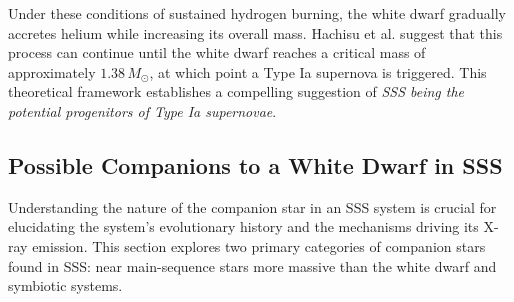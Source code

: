 			Under these conditions of sustained hydrogen burning, the white dwarf gradually accretes helium while increasing its overall mass. Hachisu et al. suggest that this process can continue until the white dwarf reaches a critical mass of approximately $1.38\,M_{\odot}$, at which point a Type Ia supernova is triggered. This theoretical framework establishes a compelling suggestion of \textit{SSS being the potential progenitors of Type Ia supernovae}.
		
		\subsection{Possible Companions to a White Dwarf in SSS} \label{introduction:current_status:wd-companions}
			Understanding the nature of the companion star in an SSS system is crucial for elucidating the system's evolutionary history and the mechanisms driving its X-ray emission. This section explores two primary categories of companion stars found in SSS: near main-sequence stars more massive than the white dwarf and symbiotic systems.
		
